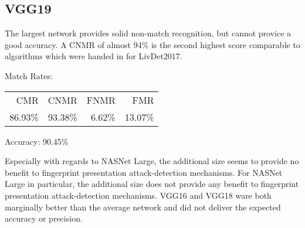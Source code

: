 \subsection{VGG19}
\begin{minipage}[c]{0.7\textwidth}
    The largest network provides solid non-match recognition, but cannot provice a good accuracy.
    A CNMR of almost 94\% is the second highest score comparable to algorithms which were handed in for LivDet2017.

    \medskip\centering Match Rates: 
    \begin{tabular}{ r  r  r  r |}
        CMR       & CNMR      & FNMR     & FMR     \\
        86.93\%   & 93.38\%   & 6.62\%   & 13.07\%  \\
    \end{tabular} \hspace{2mm} Accuracy: 90.45\%
\end{minipage}
\hfill
\begin{minipage}[c]{0.3\textwidth}
    \centering
    
\end{minipage}


Especially with regards to NASNet Large, the additional size seems to provide no benefit to fingerprint presentation attack-detection mechanisms.
For NASNet Large in particular, the additional size does not provide any benefit to fingerprint presentation attack-detection mechanisms.
VGG16 and VGG18 ware both marginally better than the average network and did not deliver the expected accuracy or precision.
